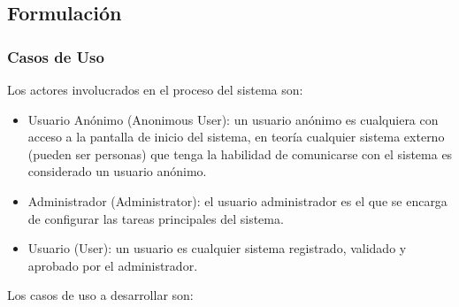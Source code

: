 \subsection{Formulación}
\subsubsection{Casos de Uso}

Los actores involucrados en el proceso del sistema son:

\begin{itemize}

	\item{Usuario Anónimo} (Anonimous User): un usuario anónimo es cualquiera con acceso a la pantalla de inicio del sistema, en teoría cualquier sistema externo (pueden ser personas) que tenga la habilidad de comunicarse con el sistema es considerado un usuario anónimo.
	
	\item{Administrador} (Administrator): el usuario administrador es el que se encarga de configurar las tareas principales del sistema.
	
	\item{Usuario} (User): un usuario es cualquier sistema registrado, validado y aprobado por el administrador.

\end{itemize}

Los casos de uso a desarrollar son:

